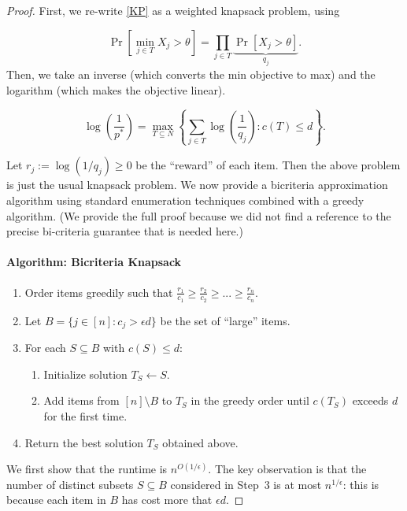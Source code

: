 \documentclass[11pt]{article}
\theoremstyle{remark}
\theoremstyle{plain}
\theoremstyle{remark}
\begin{document}
\begin{proof}

First, we re-write \eqref{KP} as a weighted knapsack problem, using  

    \[  \Pr\left[ \min_{j \in T}  X_j  > \theta \right] = \prod_{j \in T} \underbrace{\Pr[X_j > \theta ]}_{q_j} . \]
 Then, we take an inverse (which converts the min objective to max) and the logarithm (which makes  the objective linear). 

     \[ \log(\frac1{p^*}) =  \max_{T \subseteq N }\left\{\sum_{j \in T}{\log\left(\frac1{q_j} \right)} : c(T) \leq d \right\}. 
    \]

    Let $r_j:=\log(1/q_j)\ge 0$ be the ``reward'' of each item. Then the above problem is just the usual knapsack problem. We now provide a bicriteria approximation algorithm using standard enumeration techniques combined with a greedy algorithm. (We provide the full proof because we did not find a  reference to the precise  bi-criteria guarantee that is needed here.)  
    

\paragraph{Algorithm: Bicriteria Knapsack}
    \begin{enumerate}
    \label{alg:knap}
        \item Order items greedily such that  $ \frac{r_1}{c_1} \ge \frac{r_2}{c_2} \ge ... \ge \frac{r_n}{c_n}$.
        \item Let $B = \{j\in [n]: c_j > \epsilon d \}$ be the set of ``large'' items.
        \item For each $S \subseteq B$ with $c(S) \leq d$:
        \begin{enumerate}
            \item Initialize solution $T_S\gets  S$.
            \item Add items from $[n]\setminus B$ to $T_S$ in the greedy order  until $c(T_S)$ exceeds $d$ for the first time.
        \end{enumerate}
        \item Return the best solution $T_S$ obtained above.
    \end{enumerate}

We first show that the runtime is $n^{O(1/\epsilon)}$. The key observation is that the number of distinct subsets $S\subseteq B$ considered in Step~3 is at most $n^{1/\epsilon}$: this is because each item in $B$ has cost more that $\epsilon d$.  


\end{proof}
\end{document}
